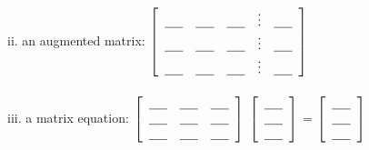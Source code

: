 \begin{myexa}[\bd{a}]
\begin{tabbing}
		\indent ii.  \> an augmented matrix: $\left[ \begin{array}{ccccc}  \underline{\hspace{.2in} }  &  \underline{\hspace{.2in} } & \underline{\hspace{.2in} } & \vdots & \underline{\hspace{.2in} } \\	 \underline{\hspace{.2in} } &  \underline{\hspace{.2in} } & \underline{\hspace{.2in} }  & \vdots & \underline{\hspace{.2in} } \\	 \underline{\hspace{.2in} }  &  \underline{\hspace{.2in} } & \underline{\hspace{.2in} }  & \vdots & \underline{\hspace{.2in} }  \end{array} \right]$ \\
		\\
		\indent iii. \> a matrix equation:  $\left[ \begin{array}{ccc} \underline{\hspace{.2in} }  &  \underline{\hspace{.2in} } & \underline{\hspace{.2in} }  \\	 \underline{\hspace{.2in} }  &  \underline{\hspace{.2in} } & \underline{\hspace{.2in} } \\ \underline{\hspace{.2in} }  &  \underline{\hspace{.2in} } & \underline{\hspace{.2in} }\\
		   \end{array} \right]$ $\left[ \begin{array}{c} \underline{\hspace{.2in} } \\ \underline{\hspace{.2in} }  \\ \underline{\hspace{.2in} }	\\ \end{array} \right]$  =  $\left[ \begin{array}{c} \underline{\hspace{.2in} } \\  \underline{\hspace{.2in} } \\ \underline{\hspace{.2in} }	\\    \end{array} \right]$\\
	\end{tabbing}
\end{myexa}

